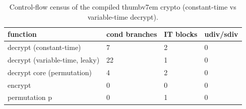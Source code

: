 \begin{table}[t]
  \centering
  \caption{Control-flow census of the compiled thumbv7em crypto (constant-time vs variable-time decrypt).}
  \label{tab:ctbinary}
  \begin{tabular}{llll}
    \toprule
    function & cond branches & IT blocks & udiv/sdiv \\
    \midrule
    decrypt (constant-time) & 7 & 2 & 0 \\
    decrypt (variable-time, leaky) & 22 & 1 & 0 \\
    decrypt core (permutation) & 4 & 2 & 0 \\
    encrypt & 0 & 0 & 0 \\
    permutation p & 0 & 1 & 0 \\
    \bottomrule
  \end{tabular}
\end{table}
